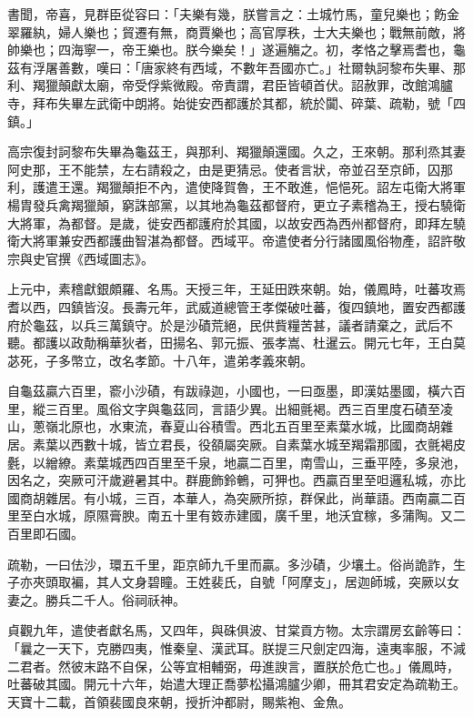 \begin{pinyinscope}
 書聞，帝喜，見群臣從容曰：「夫樂有幾，朕嘗言之：土城竹馬，童兒樂也；飭金翠羅紈，婦人樂也；貿遷有無，商賈樂也；高官厚秩，士大夫樂也；戰無前敵，將帥樂也；四海寧一，帝王樂也。朕今樂矣！」遂遍觴之。初，孝恪之擊焉耆也，龜茲有浮屠善數，嘆曰：「唐家終有西域，不數年吾國亦亡。」社爾執訶黎布失畢、那利、羯獵顛獻太廟，帝受俘紫微殿。帝責謂，君臣皆頓首伏。詔赦罪，改館鴻臚寺，拜布失畢左武衛中朗將。始徙安西都護於其都，統於闐、碎葉、疏勒，號「四鎮。」



 高宗復封訶黎布失畢為龜茲王，與那利、羯獵顛還國。久之，王來朝。那利烝其妻阿史那，王不能禁，左右請殺之，由是更猜忌。使者言狀，帝並召至京師，囚那利，護遣王還。羯獵顛拒不內，遣使降賀魯，王不敢進，悒悒死。詔左屯衛大將軍楊胄發兵禽羯獵顛，窮誅部黨，以其地為龜茲都督府，更立子素稽為王，授右驍衛大將軍，為都督。是歲，徙安西都護府於其國，以故安西為西州都督府，即拜左驍衛大將軍兼安西都護曲智湛為都督。西域平。帝遣使者分行諸國風俗物產，詔許敬宗與史官撰《西域圖志》。



 上元中，素稽獻銀頗羅、名馬。天授三年，王延田跌來朝。始，儀鳳時，吐蕃攻焉耆以西，四鎮皆沒。長壽元年，武威道總管王孝傑破吐蕃，復四鎮地，置安西都護府於龜茲，以兵三萬鎮守。於是沙磧荒絕，民供貲糧苦甚，議者請棄之，武后不聽。都護以政勣稱華狄者，田揚名、郭元振、張孝嵩、杜暹云。開元七年，王白莫苾死，子多幣立，改名孝節。十八年，遣弟孝義來朝。



 自龜茲贏六百里，窬小沙磧，有跋祿迦，小國也，一曰亟墨，即漢姑墨國，橫六百里，縱三百里。風俗文字與龜茲同，言語少異。出細氈褐。西三百里度石磧至凌山，蔥嶺北原也，水東流，春夏山谷積雪。西北五百里至素葉水城，比國商胡雜居。素葉以西數十城，皆立君長，役頟屬突厥。自素葉水城至羯霜那國，衣氈褐皮氎，以繒繚。素葉城西四百里至千泉，地贏二百里，南雪山，三垂平陸，多泉池，因名之，突厥可汗歲避暑其中。群鹿飾鈴鵪，可狎也。西贏百里至呾邏私城，亦比國商胡雜居。有小城，三百，本華人，為突厥所掠，群保此，尚華語。西南贏二百里至白水城，原隰膏腴。南五十里有笯赤建國，廣千里，地沃宜稼，多蒲陶。又二百里即石國。



 疏勒，一曰佉沙，環五千里，距京師九千里而贏。多沙磧，少壤土。俗尚詭詐，生子亦夾頭取褊，其人文身碧瞳。王姓裴氏，自號「阿摩支」，居迦師城，突厥以女妻之。勝兵二千人。俗祠祅神。



 貞觀九年，遣使者獻名馬，又四年，與硃俱波、甘棠貢方物。太宗謂房玄齡等曰：「曩之一天下，克勝四夷，惟秦皇、漢武耳。朕提三尺劍定四海，遠夷率服，不減二君者。然彼末路不自保，公等宜相輔弼，毋進諛言，置朕於危亡也。」儀鳳時，吐蕃破其國。開元十六年，始遣大理正喬夢松攝鴻臚少卿，冊其君安定為疏勒王。天寶十二載，首領裴國良來朝，授折沖都尉，賜紫袍、金魚。




\end{pinyinscope}
